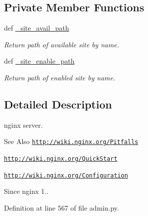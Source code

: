 \subsection*{Private Member Functions}
\begin{DoxyCompactItemize}
\item 
def \hyperlink{classadmin_1_1www_1_1nginx_aca978777776a324a0c3ac506100da002}{\-\_\-site\-\_\-avail\-\_\-path}
\begin{DoxyCompactList}\small\item\em Return path of available site by name. \end{DoxyCompactList}\item 
def \hyperlink{classadmin_1_1www_1_1nginx_af4bc4f7da3d2c56ba8e4b61b16052394}{\-\_\-site\-\_\-enable\-\_\-path}
\begin{DoxyCompactList}\small\item\em Return path of enabled site by name. \end{DoxyCompactList}\end{DoxyCompactItemize}


\subsection{Detailed Description}
nginx server. 

\begin{DoxySeeAlso}{See Also}
\href{http://wiki.nginx.org/Pitfalls}{\tt http\-://wiki.\-nginx.\-org/\-Pitfalls} 

\href{http://wiki.nginx.org/QuickStart}{\tt http\-://wiki.\-nginx.\-org/\-Quick\-Start} 

\href{http://wiki.nginx.org/Configuration}{\tt http\-://wiki.\-nginx.\-org/\-Configuration} 
\end{DoxySeeAlso}
\begin{DoxySince}{Since}
nginx 1.. 
\end{DoxySince}


Definition at line 567 of file admin.\-py.



